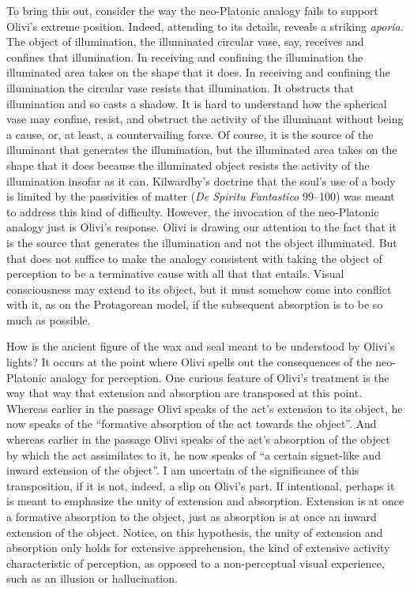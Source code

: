 To bring this out, consider the way the neo-Platonic analogy fails to support Olivi's extreme position. Indeed, attending to its details, reveals a striking \emph{aporia}. The object of illumination, the illuminated circular vase, say, receives and confines that illumination. In receiving and confining the illumination the illuminated area takes on the shape that it does. In receiving and confining the illumination the circular vase resists that illumination. It obstructs that illumination and so casts a shadow. It is hard to understand how the spherical vase may confine, resist, and obstruct the activity of the illuminant without being a cause, or, at least, a countervailing force. Of course, it is the source of the illuminant that generates the illumination, but the illuminated area takes on the shape that it does because the illuminated object resists the activity of the illumination insofar as it can. Kilwardby's doctrine that the soul's use of a body is limited by the passivities of matter (\emph{De Spiritu Fantastico} 99–100) was meant to address this kind of difficulty. However, the invocation of the neo-Platonic analogy just is Olivi's response. Olivi is drawing our attention to the fact that it is the source that generates the illumination and not the object illuminated. But that does not suffice to make the analogy consistent with taking the object of perception to be a terminative cause with all that that entails. Visual consciousness may extend to its object, but it must somehow come into conflict with it, as on the Protagorean model, if the subsequent absorption is to be so much as possible. 

How is the ancient figure of the wax and seal meant to be understood by Olivi's lights? It occurs at the point where Olivi spells out the consequences of the neo-Platonic analogy for perception. One curious feature of Olivi's treatment is the way that way that extension and absorption are transposed at this point. Whereas earlier in the passage Olivi speaks of the act's extension to its object, he now speaks of the ``formative absorption of the act towards the object''. And whereas earlier in the passage Olivi speaks of the act's absorption of the object by which the act assimilates to it, he now speaks of ``a certain signet-like and inward extension of the object''. I am uncertain of the significance of this transposition, if it is not, indeed, a slip on Olivi's part. If intentional, perhaps it is meant to emphasize the unity of extension and absorption. Extension is at once a formative absorption to the object, just as absorption is at once an inward extension of the object. Notice, on this hypothesis, the unity of extension and absorption only holds for extensive apprehension, the kind of extensive activity characteristic of perception, as opposed to a non-perceptual visual experience, such as an illusion or hallucination.


